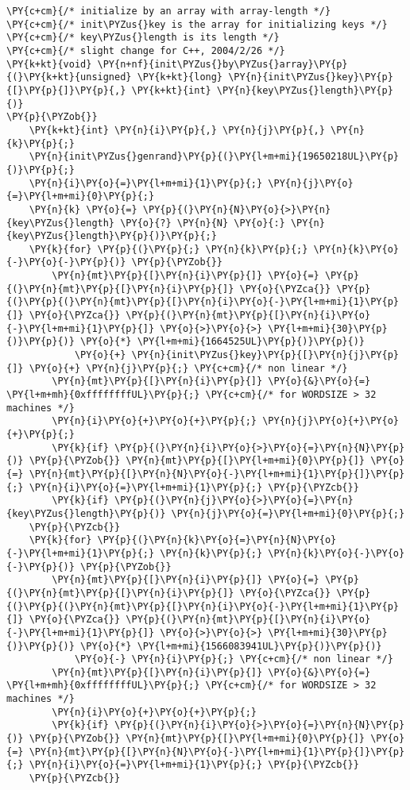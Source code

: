 \begin{Verbatim}[commandchars=\\\{\}]
\PY{c+cm}{/* initialize by an array with array-length */}
\PY{c+cm}{/* init\PYZus{}key is the array for initializing keys */}
\PY{c+cm}{/* key\PYZus{}length is its length */}
\PY{c+cm}{/* slight change for C++, 2004/2/26 */}
\PY{k+kt}{void} \PY{n+nf}{init\PYZus{}by\PYZus{}array}\PY{p}{(}\PY{k+kt}{unsigned} \PY{k+kt}{long} \PY{n}{init\PYZus{}key}\PY{p}{[}\PY{p}{]}\PY{p}{,} \PY{k+kt}{int} \PY{n}{key\PYZus{}length}\PY{p}{)}
\PY{p}{\PYZob{}}
	\PY{k+kt}{int} \PY{n}{i}\PY{p}{,} \PY{n}{j}\PY{p}{,} \PY{n}{k}\PY{p}{;}
	\PY{n}{init\PYZus{}genrand}\PY{p}{(}\PY{l+m+mi}{19650218UL}\PY{p}{)}\PY{p}{;}
	\PY{n}{i}\PY{o}{=}\PY{l+m+mi}{1}\PY{p}{;} \PY{n}{j}\PY{o}{=}\PY{l+m+mi}{0}\PY{p}{;}
	\PY{n}{k} \PY{o}{=} \PY{p}{(}\PY{n}{N}\PY{o}{>}\PY{n}{key\PYZus{}length} \PY{o}{?} \PY{n}{N} \PY{o}{:} \PY{n}{key\PYZus{}length}\PY{p}{)}\PY{p}{;}
	\PY{k}{for} \PY{p}{(}\PY{p}{;} \PY{n}{k}\PY{p}{;} \PY{n}{k}\PY{o}{-}\PY{o}{-}\PY{p}{)} \PY{p}{\PYZob{}}
		\PY{n}{mt}\PY{p}{[}\PY{n}{i}\PY{p}{]} \PY{o}{=} \PY{p}{(}\PY{n}{mt}\PY{p}{[}\PY{n}{i}\PY{p}{]} \PY{o}{\PYZca{}} \PY{p}{(}\PY{p}{(}\PY{n}{mt}\PY{p}{[}\PY{n}{i}\PY{o}{-}\PY{l+m+mi}{1}\PY{p}{]} \PY{o}{\PYZca{}} \PY{p}{(}\PY{n}{mt}\PY{p}{[}\PY{n}{i}\PY{o}{-}\PY{l+m+mi}{1}\PY{p}{]} \PY{o}{>}\PY{o}{>} \PY{l+m+mi}{30}\PY{p}{)}\PY{p}{)} \PY{o}{*} \PY{l+m+mi}{1664525UL}\PY{p}{)}\PY{p}{)}
			\PY{o}{+} \PY{n}{init\PYZus{}key}\PY{p}{[}\PY{n}{j}\PY{p}{]} \PY{o}{+} \PY{n}{j}\PY{p}{;} \PY{c+cm}{/* non linear */}
		\PY{n}{mt}\PY{p}{[}\PY{n}{i}\PY{p}{]} \PY{o}{&}\PY{o}{=} \PY{l+m+mh}{0xffffffffUL}\PY{p}{;} \PY{c+cm}{/* for WORDSIZE > 32 machines */}
		\PY{n}{i}\PY{o}{+}\PY{o}{+}\PY{p}{;} \PY{n}{j}\PY{o}{+}\PY{o}{+}\PY{p}{;}
		\PY{k}{if} \PY{p}{(}\PY{n}{i}\PY{o}{>}\PY{o}{=}\PY{n}{N}\PY{p}{)} \PY{p}{\PYZob{}} \PY{n}{mt}\PY{p}{[}\PY{l+m+mi}{0}\PY{p}{]} \PY{o}{=} \PY{n}{mt}\PY{p}{[}\PY{n}{N}\PY{o}{-}\PY{l+m+mi}{1}\PY{p}{]}\PY{p}{;} \PY{n}{i}\PY{o}{=}\PY{l+m+mi}{1}\PY{p}{;} \PY{p}{\PYZcb{}}
		\PY{k}{if} \PY{p}{(}\PY{n}{j}\PY{o}{>}\PY{o}{=}\PY{n}{key\PYZus{}length}\PY{p}{)} \PY{n}{j}\PY{o}{=}\PY{l+m+mi}{0}\PY{p}{;}
	\PY{p}{\PYZcb{}}
	\PY{k}{for} \PY{p}{(}\PY{n}{k}\PY{o}{=}\PY{n}{N}\PY{o}{-}\PY{l+m+mi}{1}\PY{p}{;} \PY{n}{k}\PY{p}{;} \PY{n}{k}\PY{o}{-}\PY{o}{-}\PY{p}{)} \PY{p}{\PYZob{}}
		\PY{n}{mt}\PY{p}{[}\PY{n}{i}\PY{p}{]} \PY{o}{=} \PY{p}{(}\PY{n}{mt}\PY{p}{[}\PY{n}{i}\PY{p}{]} \PY{o}{\PYZca{}} \PY{p}{(}\PY{p}{(}\PY{n}{mt}\PY{p}{[}\PY{n}{i}\PY{o}{-}\PY{l+m+mi}{1}\PY{p}{]} \PY{o}{\PYZca{}} \PY{p}{(}\PY{n}{mt}\PY{p}{[}\PY{n}{i}\PY{o}{-}\PY{l+m+mi}{1}\PY{p}{]} \PY{o}{>}\PY{o}{>} \PY{l+m+mi}{30}\PY{p}{)}\PY{p}{)} \PY{o}{*} \PY{l+m+mi}{1566083941UL}\PY{p}{)}\PY{p}{)}
			\PY{o}{-} \PY{n}{i}\PY{p}{;} \PY{c+cm}{/* non linear */}
		\PY{n}{mt}\PY{p}{[}\PY{n}{i}\PY{p}{]} \PY{o}{&}\PY{o}{=} \PY{l+m+mh}{0xffffffffUL}\PY{p}{;} \PY{c+cm}{/* for WORDSIZE > 32 machines */}
		\PY{n}{i}\PY{o}{+}\PY{o}{+}\PY{p}{;}
		\PY{k}{if} \PY{p}{(}\PY{n}{i}\PY{o}{>}\PY{o}{=}\PY{n}{N}\PY{p}{)} \PY{p}{\PYZob{}} \PY{n}{mt}\PY{p}{[}\PY{l+m+mi}{0}\PY{p}{]} \PY{o}{=} \PY{n}{mt}\PY{p}{[}\PY{n}{N}\PY{o}{-}\PY{l+m+mi}{1}\PY{p}{]}\PY{p}{;} \PY{n}{i}\PY{o}{=}\PY{l+m+mi}{1}\PY{p}{;} \PY{p}{\PYZcb{}}
	\PY{p}{\PYZcb{}}


\end{Verbatim}
